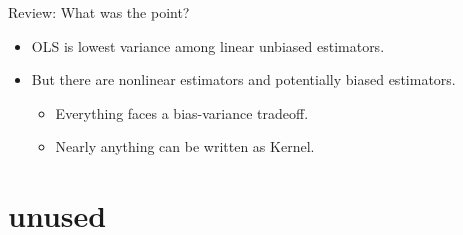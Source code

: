 \begin{frame}{Review: What was the point?}
  \begin{itemize}
  \item OLS is lowest variance among linear unbiased estimators.
  \item But there are \alert{nonlinear} estimators and potentially \alert{biased} estimators.
  \begin{itemize}
  \item Everything faces a \alert{bias-variance} tradeoff.
  \item Nearly anything can be written as Kernel.
  \end{itemize}
  \end{itemize}

\end{frame}

\begin{frame}[allowframebreaks]
  
  
\end{frame}



%



\section*{unused}


